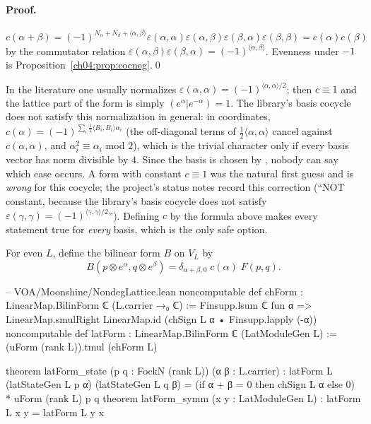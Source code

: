 \paragraph{Proof.} $c(\alpha+\beta)=(-1)^{N_\alpha+N_\beta+\langle\alpha,\beta\rangle}\varepsilon(\alpha,\alpha)
\varepsilon(\alpha,\beta)\varepsilon(\beta,\alpha)\varepsilon(\beta,\beta)=c(\alpha)c(\beta)$ by the commutator relation
$\varepsilon(\alpha,\beta)\varepsilon(\beta,\alpha)=(-1)^{\langle\alpha,\beta\rangle}$. Evenness under $-1$ is
Proposition~\ref{ch04:prop:cocneg}.\qed

\begin{warning}[title={Trap: the charge sign is not constant, in general}]
In the literature one usually normalizes $\varepsilon(\alpha,\alpha)=(-1)^{\langle\alpha,\alpha\rangle/2}$; then $c\equiv1$
and the lattice part of the form is simply $(e^\alpha|e^{-\alpha})=1$. The library's basis cocycle does
not satisfy this normalization in general: in coordinates,
$c(\alpha)=(-1)^{\sum_i\frac12\langle B_i,B_i\rangle\alpha_i}$ (the off-diagonal terms of
$\tfrac12\langle\alpha,\alpha\rangle$ cancel against $c(\alpha,\alpha)$, and $\alpha_i^2\equiv\alpha_i$ mod $2$),
which is the trivial character only if every basis vector has norm divisible by $4$. Since the basis
is chosen by , nobody can say which case occurs. A form with constant
$c\equiv1$ was the natural first guess and is \emph{wrong} for this cocycle; the project's status
notes record this correction (``NOT constant, because the library's basis cocycle does not satisfy
$\varepsilon(\gamma,\gamma)=(-1)^{\langle\gamma,\gamma\rangle/2}$''). Defining $c$ by the formula above makes
every statement true for \emph{every} basis, which is the only safe option.
\end{warning}

\begin{definition}\label{ch04:def:latform}
For even $L$, define the bilinear form $B$ on $V_L$ by
\begin{equation*}
  B(p\otimes e^\alpha,q\otimes e^\beta)=\delta_{\alpha+\beta,0}\;c(\alpha)\;F(p,q).
\end{equation*}
\end{definition}

\begin{leancode}
-- VOA/Moonshine/NondegLattice.lean
noncomputable def chForm : LinearMap.BilinForm ℂ (L.carrier →₀ ℂ) :=
  Finsupp.lsum ℂ fun α => LinearMap.smulRight LinearMap.id (chSign L α • Finsupp.lapply (-α))
noncomputable def latForm : LinearMap.BilinForm ℂ (LatModuleGen L) :=
  (uForm (rank L)).tmul (chForm L)

theorem latForm_state (p q : FockN (rank L)) (α β : L.carrier) :
    latForm L (latStateGen L p α) (latStateGen L q β)
      = (if α + β = 0 then chSign L α else 0) * uForm (rank L) p q
theorem latForm_symm (x y : LatModuleGen L) : latForm L x y = latForm L y x
\end{leancode}


